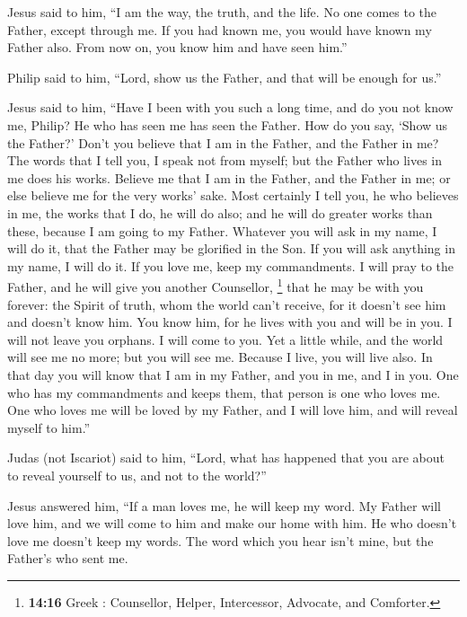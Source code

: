  Jesus said to him, ``I am the way, the truth, and the
life. No one comes to the Father, except through me.  If
you had known me, you would have known my Father also. From now on, you
know him and have seen him.''

 Philip said to him, ``Lord, show us the Father, and that
will be enough for us.''

 Jesus said to him, ``Have I been with you such a long
time, and do you not know me, Philip? He who has seen me has seen the
Father. How do you say, `Show us the Father?'  Don't you
believe that I am in the Father, and the Father in me? The words that I
tell you, I speak not from myself; but the Father who lives in me does
his works.  Believe me that I am in the Father, and the
Father in me; or else believe me for the very works' sake.
 Most certainly I tell you, he who believes in me, the
works that I do, he will do also; and he will do greater works than
these, because I am going to my Father.  Whatever you
will ask in my name, I will do it, that the Father may be glorified in
the Son.  If you will ask anything in my name, I will do
it.  If you love me, keep my commandments.
 I will pray to the Father, and he will give you another
Counsellor, \footnote{\textbf{14:16} Greek :
  Counsellor, Helper, Intercessor, Advocate, and Comforter.} that he may
be with you forever:  the Spirit of truth, whom the world
can't receive, for it doesn't see him and doesn't know him. You know
him, for he lives with you and will be in you.  I will
not leave you orphans. I will come to you.  Yet a little
while, and the world will see me no more; but you will see me. Because I
live, you will live also.  In that day you will know that
I am in my Father, and you in me, and I in you.  One who
has my commandments and keeps them, that person is one who loves me. One
who loves me will be loved by my Father, and I will love him, and will
reveal myself to him.''

 Judas (not Iscariot) said to him, ``Lord, what has
happened that you are about to reveal yourself to us, and not to the
world?''

 Jesus answered him, ``If a man loves me, he will keep my
word. My Father will love him, and we will come to him and make our home
with him.  He who doesn't love me doesn't keep my words.
The word which you hear isn't mine, but the Father's who sent me.

